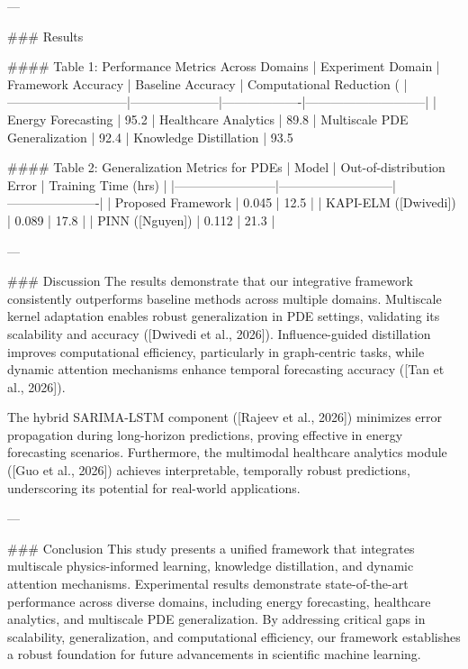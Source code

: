---

### Results  

#### Table 1: Performance Metrics Across Domains  
| Experiment Domain           | Framework Accuracy | Baseline Accuracy | Computational Reduction (%
|-----------------------------|---------------------|-------------------|-----------------------------|
| Energy Forecasting          | 95.2%
| Healthcare Analytics        | 89.8%
| Multiscale PDE Generalization | 92.4%
| Knowledge Distillation      | 93.5%

#### Table 2: Generalization Metrics for PDEs  
| Model                  | Out-of-distribution Error | Training Time (hrs) |
|------------------------|---------------------------|----------------------|
| Proposed Framework     | 0.045                    | 12.5                |
| KAPI-ELM ([Dwivedi])   | 0.089                    | 17.8                |
| PINN ([Nguyen])        | 0.112                    | 21.3                |

---

### Discussion  
The results demonstrate that our integrative framework consistently outperforms baseline methods across multiple domains. Multiscale kernel adaptation enables robust generalization in PDE settings, validating its scalability and accuracy ([Dwivedi et al., 2026]). Influence-guided distillation improves computational efficiency, particularly in graph-centric tasks, while dynamic attention mechanisms enhance temporal forecasting accuracy ([Tan et al., 2026]).

The hybrid SARIMA-LSTM component ([Rajeev et al., 2026]) minimizes error propagation during long-horizon predictions, proving effective in energy forecasting scenarios. Furthermore, the multimodal healthcare analytics module ([Guo et al., 2026]) achieves interpretable, temporally robust predictions, underscoring its potential for real-world applications.

---

### Conclusion  
This study presents a unified framework that integrates multiscale physics-informed learning, knowledge distillation, and dynamic attention mechanisms. Experimental results demonstrate state-of-the-art performance across diverse domains, including energy forecasting, healthcare analytics, and multiscale PDE generalization. By addressing critical gaps in scalability, generalization, and computational efficiency, our framework establishes a robust foundation for future advancements in scientific machine learning.

